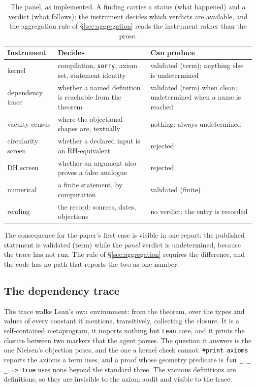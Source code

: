 \documentclass[11pt,a4paper]{article}
\newcommand{\RH}{\mathrm{RH}}
\newcommand{\DHf}{\mathrm{DH}}
\newcommand{\verdict}[1]{\textsf{#1}}
\begin{document}
\begin{table}[htbp]
\centering
\caption{The panel, as implemented. A finding carries a status (what happened) and a verdict
(what follows); the instrument decides which verdicts are available, and the aggregation rule
of \S\ref{sec:aggregation} reads the instrument rather than the prose.}
\label{tab:panel}
\footnotesize
\begin{tabularx}{\textwidth}{@{}>{\raggedright\arraybackslash}p{2.6cm}>{\raggedright\arraybackslash}p{3.5cm}>{\raggedright\arraybackslash}X@{}}
\toprule
Instrument & Decides & Can produce \\
\midrule
kernel & compilation, \texttt{sorry}, axiom set, statement identity &
  \verdict{validated (term)}; anything else is \verdict{undetermined} \\
dependency trace & whether a named definition is reachable from the theorem &
  \verdict{validated (term)} when clean; \verdict{undetermined} when a name is reached \\
vacuity census & where the objectional shapes are, textually & nothing: always
  \verdict{undetermined} \\
circularity screen & whether a declared input is an $\RH$-equivalent & \verdict{rejected} \\
$\DHf$ screen & whether an argument also proves a false analogue & \verdict{rejected} \\
numerical & a finite statement, by computation & \verdict{validated (finite)} \\
reading & the record: sources, dates, objections & no verdict; the entry is recorded \\
\bottomrule
\end{tabularx}
\end{table}

The consequence for the paper's first case is visible in one report: the published statement is
\verdict{validated (term)} while the \emph{panel} verdict is \verdict{undetermined}, because the
trace has not run. The rule of \S\ref{sec:aggregation} requires the difference, and the code has no
path that reports the two as one number.

\subsection{The dependency trace}

The trace walks Lean's own environment: from the theorem, over the types and values of every
constant it mentions, transitively, collecting the closure. It is a self-contained metaprogram,
it imports nothing but \texttt{Lean} core, and it prints the closure between two markers that
the agent parses. The question it answers is the one Nielsen's objection poses, and the one a
kernel check cannot: \texttt{\#print axioms} reports the axioms a term uses, and a proof whose
geometry predicate is \texttt{fun \_ \_ \_ => True} uses none beyond the standard three. The
vacuous definitions are definitions, so they are invisible to the axiom audit and visible to
the trace.
\end{document}
